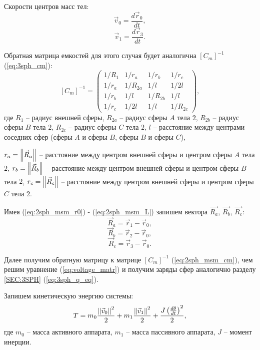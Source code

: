 Скорости центров масс тел:
\begin{equation}
\label{eq:2sph_msm_v0}
	\vec{v}_0 = \frac{d \vec{r}_0}{dt},
\end{equation}
\begin{equation}
\label{eq:2sph_msm_v1}
	\vec{v}_1 = \frac{d \vec{r}_3}{dt}.
\end{equation}

Обратная матрица емкостей для этого случая будет аналогична $[C_m]^{-1}$ (\ref{eq:3sph_cm}):
\begin{equation}
\label{eq:2sph_msm_cm}
	[C_m]^{-1} = 
	\begin{pmatrix}
		1/R_1	&	1/r_a	&	1/r_b	&	1/r_c\\
		1/r_a	&	1/R_{2a}	&	1/l		&	1/2l\\
		1/r_b	&	1/l		&	1/R_{2b}	&	1/l\\
		1/r_c	&	1/2l		&	1/l		&	1/R_{2c}
	\end{pmatrix},
\end{equation}
где $R_1$ – радиус внешней сферы, $R_{2a}$ – радиус сферы $A$ тела $2$, $R_{2b}$ – радиус сферы $B$ тела $2$, $R_{2c}$ – радиус сферы $C$ тела $2$, $l$ – расстояние между центрами соседних сфер (сферы $A$ и сферы $B$, сферы $B$ и сферы $C$),

\noindent $r_a = \left\lVert\vec{R}_a\right\rVert$ – расстояние между центром внешней сферы и центром сферы $A$ тела $2$, $r_b = \left\lVert\vec{R}_b\right\rVert$ – расстояние между центром внешней сферы и центром сферы $B$ тела $2$, $r_c = \left\lVert\vec{R}_c\right\rVert$ – расстояние между центром внешней сферы и центром сферы $C$ тела $2$.

Имея (\ref{eq:2sph_msm_r0}) - (\ref{eq:2sph_msm_L}) запишем вектора $\vec{R_a}$, $\vec{R_b}$, $\vec{R_c}$:
\begin{equation}
\label{eq:2sph_msm_Ra}
	\vec{R}_a = \vec{r}_1 - \vec{r}_0,
\end{equation}
\begin{equation}
\label{eq:2sph_msm_Rb}
	\vec{R}_b = \vec{r}_2 - \vec{r}_0,
\end{equation}
\begin{equation}
\label{eq:2sph_msm_Rc}
	\vec{R}_c = \vec{r}_3 - \vec{r}_0.
\end{equation}

Далее получим обратную матрицу к матрице $[C_m]^{-1}$ (\ref{eq:2sph_msm_cm}), чем решим уравнение (\ref{eq:voltage_matr}) и получим заряды сфер аналогично разделу \ref{SEC:3SPH} (\ref{eq:3sph_q_eq}).

Запишем кинетическую энергию системы:
\begin{equation}
\label{eq:2sph_msm_T}
	T = m_0 \frac{\left\lVert\vec{v}_0\right\rVert^2}{2} + m_1 \frac{\left\lVert\vec{v}_1\right\rVert^2}{2} + \frac{J\left(\frac{d\theta}{dt}\right)^2}{2},
\end{equation}
где $m_0$ – масса активного аппарата, $m_1$ – масса пассивного аппарата, $J$ – момент инерции.

